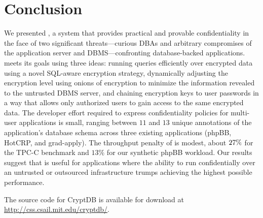 \section{Conclusion}
\label{s:concl}

We presented \name{}, a system that provides practical and provable
confidentiality in the face of two significant threats---curious DBAs
and arbitrary compromises of the application server and
DBMS---confronting database-backed applications.  \name{} meets its
goals using three ideas: running queries efficiently over encrypted
data using a novel SQL-aware encryption strategy, dynamically
adjusting the encryption level using onions of encryption to minimize
the information revealed to the untrusted DBMS server, and chaining
encryption keys to user passwords in a way that allows only authorized
users to gain access to the same encrypted data.  The developer effort
required to express confidentiality policies for multi-user
applications is small, ranging between $11$ and $13$ unique
annotations of the application's database schema across three existing
applications (phpBB, HotCRP, and grad-apply).  The throughput penalty
of \name{} is modest, about $27\%$ for the TPC-C benchmark and $13\%$
for our synthetic phpBB workload.  Our results suggest that \name{} is
useful for applications where the ability to run confidentially over
an untrusted or outsourced infrastructure trumps achieving the highest
possible performance.

The source code for CryptDB is available for download at
\url{http://css.csail.mit.edu/cryptdb/}.


